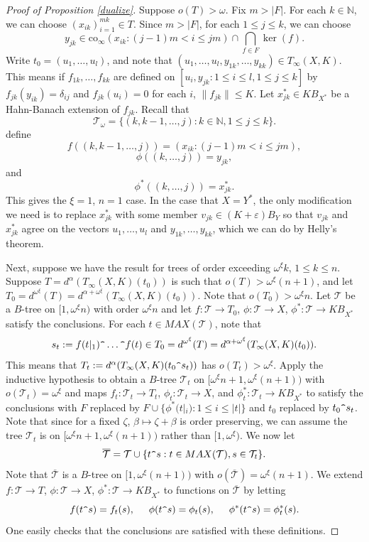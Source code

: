\documentclass[12pt]{amsart}
\theoremstyle{definition}
\newcommand{\nn}{\mathbb{N}}
\newcommand{\ttt}{\mathcal{T}}
\begin{document}
\begin{proof}[Proof of Proposition \ref{dualize}] Suppose $o(T)>\omega$.  Fix $m>|F|$.  For each $k\in \nn$, we can choose $(x_{ik})_{i=1}^{mk}\in T$.  Since $m>|F|$, for each $1\leqslant j\leqslant k$, we can choose $$y_{jk}\in \text{co}_\infty(x_{ik}: (j-1)m< i \leqslant jm) \cap \bigcap_{f\in F}\ker (f).$$  Write $t_0=(u_1, \ldots, u_l)$, and note that $(u_1, \ldots, u_l, y_{1k}, \ldots, y_{kk})\in T_\infty(X, K)$.  This means if $f_{1k}, \ldots, f_{kk}$ are defined on $[u_i, y_{jk}: 1\leqslant i\leqslant l, 1\leqslant j\leqslant k]$ by $f_{jk}(y_{ik})=\delta_{ij}$ and $f_{jk}(u_i)=0$ for each $i$, $\|f_{jk}\|\leqslant K$.  Let $x_{jk}^*\in KB_{X^*}$ be a Hahn-Banach extension of $f_{jk}$.  Recall that $$\ttt_\omega=\{(k, k-1, \ldots, j): k\in \nn, 1\leqslant j\leqslant k\}.$$  define $$f((k, k-1, \ldots, j))= (x_{ik}: (j-1)m< i\leqslant jm),$$  $$\phi((k, \ldots, j))=y_{jk},$$ and $$\phi^*((k, \ldots, j))=x^*_{jk}.$$  This gives the $\xi=1$, $n=1$ case. In the case that $X=Y^*$, the only modification we need is to replace $x_{jk}^*$ with some member $v_{jk}\in (K+\varepsilon)B_Y$ so that $v_{jk}$ and $x_{jk}^*$ agree on the vectors $u_1, \ldots, u_l$ and $y_{1k}, \ldots, y_{kk}$, which we can do by Helly's theorem.  


Next, suppose we have the result for trees of order exceeding $\omega^\xi k$, $1\leqslant k\leqslant n$.  Suppose $T=d^\alpha(T_\infty(X,K)(t_0))$ is such that $o(T)>\omega^\xi(n+1)$, and let $T_0=d^{\omega^\xi }(T)= d^{\alpha+\omega^\xi}(T_\infty(X, K)(t_0))$.  Note that $o(T_0)>\omega^\xi n$.  Let $\ttt$ be a $B$-tree on $[1, \omega^\xi n)$ with order $\omega^\xi n$ and let $f:\ttt\to T_0$, $\phi:\ttt\to X$, $\phi^*:\ttt\to KB_{X^*}$ satisfy the conclusions.  For each $t\in MAX(\ttt)$, note that $$s_t:=f(t|_1)\verb!^!\ldots\verb!^! f(t)\in T_0 = d^{\omega^\xi}(T)=d^{\alpha+\omega^\xi}(T_\infty(X, K)(t_0)).$$  This means that $T_t:= d^\alpha(T_\infty(X,K)(t_0\verb!^!s_t))$ has $o(T_t)>\omega^\xi$.  Apply the inductive hypothesis to obtain a $B$-tree $\ttt_t$ on $[\omega^\xi n +1, \omega^\xi(n+1))$ with $o(\ttt_t)=\omega^\xi$ and maps $f_t:\ttt_t \to T_t$, $\phi_t:\ttt_t\to X$, and $\phi^*_t:\ttt_t\to KB_{X^*}$ to satisfy the conclusions with $F$ replaced by $F\cup \{\phi^*(t|_i): 1\leqslant i\leqslant |t|\}$ and $t_0$ replaced by $t_0\verb!^!s_t$.  Note that since for a fixed $\zeta$, $\beta\mapsto \zeta+\beta$ is order preserving, we can assume the tree $\ttt_t$ is on $[\omega^\xi n+1, \omega^\xi (n+1))$ rather than $[1, \omega^\xi)$.  We now let $$\overline{\ttt}=\ttt \cup \{t\verb!^!s: t\in MAX(\ttt), s\in \ttt_t\}.$$  Note that $\overline{\ttt}$ is a $B$-tree on $[1, \omega^\xi(n+1))$ with $o(\overline{\ttt})=\omega^\xi(n+1)$.  We extend $f:\ttt\to T$, $\phi:\ttt\to X$, $\phi^*:\ttt\to KB_{X^*}$ to functions on $\overline{\ttt}$ by letting $$f(t\verb!^!s)=f_t(s), \hspace{5mm} \phi(t\verb!^!s)=\phi_t(s), \hspace{5mm} \phi^*(t\verb!^!s)=\phi^*_t(s).$$  One easily checks that the conclusions are satisfied with these definitions.  


\end{proof}
\end{document}
